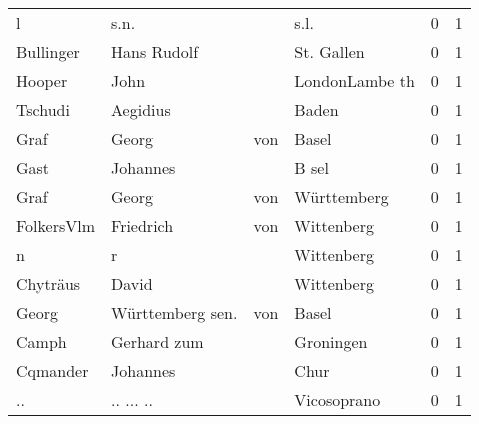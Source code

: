 \begin{center}
\begin{tiny}
\begin{longtabu}{llllrr}
                        l &                               s.n. &             &                                        s.l. &          0 &         1 \\
                Bullinger &                        Hans Rudolf &             &                                  St. Gallen &          0 &         1 \\
                   Hooper &                               John &             &                              LondonLambe th &          0 &         1 \\
                  Tschudi &                           Aegidius &             &                                       Baden &          0 &         1 \\
                     Graf &                              Georg &         von &                                       Basel &          0 &         1 \\
                     Gast &                           Johannes &             &                                       B sel &          0 &         1 \\
                     Graf &                              Georg &         von &                                 Württemberg &          0 &         1 \\
               FolkersVlm &                          Friedrich &         von &                                  Wittenberg &          0 &         1 \\
                        n &                                  r &             &                                  Wittenberg &          0 &         1 \\
                 Chyträus &                              David &             &                                  Wittenberg &          0 &         1 \\
                    Georg &                   Württemberg sen. &         von &                                       Basel &          0 &         1 \\
                    Camph &                        Gerhard zum &             &                                   Groningen &          0 &         1 \\
                 Cqmander &                           Johannes &             &                                        Chur &          0 &         1 \\
                       .. &                          .. ... .. &             &                                 Vicosoprano &          0 &         1 \\

\end{longtabu}
\end{tiny}
\end{center}
